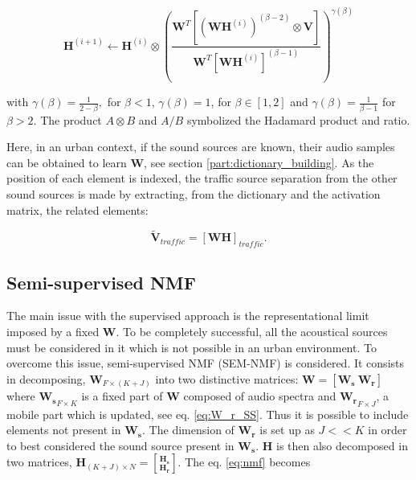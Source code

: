 \documentclass[review,5p,twocolumn,sort&compress,times]{elsarticle}
\begin{document}
\begin{equation} \label{eq:updateH}
\textbf{H}^{(i+1)} \leftarrow \textbf{H}^{(i)}\otimes\left(\frac{\textbf{W}^T \left[\left(\textbf{WH}^{(i)} \right)^{(\beta-2)}\otimes\textbf{V} \right]}{\textbf{W}^T \left[\textbf{WH}^{(i)} \right]^{(\beta-1)}}\right)^{\gamma(\beta)}
\end{equation}

with $\gamma(\beta) = \frac{1}{2-\beta},$ for $\beta < 1$, $ \gamma(\beta) = 1$, for $\beta \in \left[1,2\right]$ and $\gamma(\beta) = \frac{1}{\beta-1}$ for $\beta > 2$. The product $A\otimes B$ and $A/B$ symbolized the Hadamard product and ratio.

Here, in an urban context, if the sound sources are known, their audio samples can be obtained to learn $\mathbf{W}$, see section \ref{part:dictionary_building}. As the position of each element is indexed, the traffic source separation from the other sound sources is made by extracting, from the dictionary and the activation matrix, the related elements:

\begin{equation}\label{eq:separationExtraction}
\mathbf{\tilde{V}}_{traffic} = \left[ \mathbf{WH} \right]_{traffic}.
\end{equation}

\subsection{Semi-supervised NMF}

The main issue with the supervised approach is the representational limit imposed by a fixed $\mathbf{W}$. To be completely successful, all the acoustical sources must be considered in it which is not possible in an urban environment. To overcome this issue, semi-supervised NMF (SEM-NMF) \cite{lee_semi-supervised_2010} is considered. It consists in decomposing, $\mathbf{W}_{F \times (K+J)}$ into two distinctive matrices: $\mathbf{W} = \left[ \mathbf{W_s}~\mathbf{W_r} \right]$ where $\mathbf{W_s}_{F \times K}$ is a fixed part of $\mathbf{W}$ composed of audio spectra and $ \mathbf{W_r}_{F \times J}$, a mobile part which is updated, see eq. \ref{eq:W_r_SS}. Thus it is possible to include elements not present in $\mathbf{W_s}$. The dimension of $\mathbf{W_r}$ is set up as $J << K$ in order to best considered the sound source present in $\mathbf{W_s}$. $\mathbf{H}$ is then also decomposed in two matrices, $\mathbf{H}_{(K+J) \times N} = \genfrac[]{0pt}{0}{\mathbf{H_s}}{\mathbf{H_r}}$. The eq. \ref{eq:nmf} becomes
\end{document}
